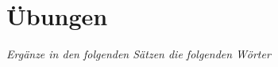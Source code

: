 \documentclass{article}
\begin{document}
%
%
%
%
%
%
%
%
%
%
%
%
%
%
%
%
%
%
%
%



\newpage
\section{Übungen}

\noindent \textit{Ergänze in den folgenden Sätzen die folgenden Wörter}

%
%
%
%
%
%
%
%
%
%
%
%
%
%
%
%
%
%
%
%




%
%
%
%
%
%
%
%
%
%
%
%
%
%
%
%
%
%
%
%
\end{document}
